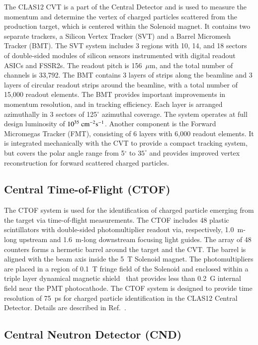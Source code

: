 \documentclass[final,3p,times,twocolumn,authoryear]{elsarticle}
\begin{document}
The CLAS12 CVT is a part of the Central Detector and is used to measure the momentum and determine the vertex of charged
particles scattered from the production target, which is centered within the Solenoid magnet. It contains two separate trackers,
a Silicon Vertex Tracker (SVT) and a Barrel Micromesh Tracker  (BMT). The SVT system includes 3 regions with 10, 14, and 18
sectors of double-sided modules of silicon sensors instrumented with digital readout ASICs and FSSR2s. The readout pitch is
156~$\mu$m, and the total number of channels is 33,792. The BMT contains 3 layers of strips along the beamline and 3 layers
of circular readout strips around the beamline, with a total number of 15,000 readout elements. The BMT provides important
improvements in momentum resolution, and in tracking efficiency. Each layer is arranged azimuthally in 3 sectors of 125$^\circ$
azimuthal coverage. The system operates at full design luminosity of $10^{35}\rm~{cm^{-2}s^{-1}}$. Another component is the
Forward Micromegas Tracker (FMT), consisting of 6 layers with 6,000 readout elements. It  is integrated mechanically with the
CVT to provide a compact tracking system, but covers the polar angle range from 5$^\circ$ to $35^\circ$ and provides improved
vertex reconstruction for forward scattered charged particles.

\subsection{Central Time-of-Flight (CTOF)}

The CTOF system is used for the identification of charged particle emerging from the target via time-of-flight measurements.
The CTOF includes 48 plastic scintillators with double-sided photomultiplier readout via, respectively, 1.0~m-long upstream and
1.6~m-long downstream focusing light guides. The array of 48 counters forms a hermetic barrel around the target and the CVT.
The barrel is aligned with the beam axis inside the 5~T Solenoid magnet. The photomultipliers are placed in a region of 0.1~T
fringe field of the Solenoid and enclosed within a triple layer dynamical magnetic shield~\cite{Baturin:2012zz} that provides
less than 0.2~G internal field near the PMT photocathode. The CTOF system is designed to provide time resolution of 75~ps
for charged particle identification in the CLAS12 Central Detector. Details are described in Ref.~\cite{CTOF}.  

\subsection{Central Neutron Detector (CND)}
\end{document}
